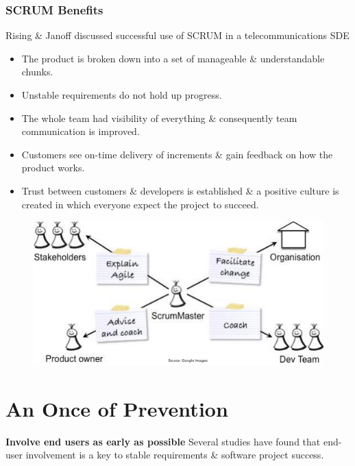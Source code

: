 \documentclass{report}
\begin{document}
\subsection{SCRUM Benefits}
\begin{multicols}{2}
\noindent Rising \& Janoff discussed successful use of SCRUM in a telecommunications SDE
\begin{itemize}
  \item The product is broken down into a set of manageable \& understandable chunks.
  \item Unstable requirements do not hold up progress.
  \item The whole team had visibility of everything \& consequently team communication is improved.
  \item Customers see on-time delivery of increments \& gain feedback on how the product works.
  \item Trust between customers \& developers is established \& a positive culture is created in which everyone expect the project to succeed.
\end{itemize}
\vfill\columnbreak
\begin{figure}[H]
\centering
\includegraphics[scale=.4,trim=1cm 1cm 1cm 1cm]{assets/CEN4010_Scrum_Cycle.jpg}
\end{figure}
\end{multicols}



\renewcommand\thechapter{A1}
\chapter{An Once of Prevention}
\noindent\textbf{Involve end users as early as possible}\newline
Several studies have found that end-user involvement is a key to stable requirements \& software project success.\newline
\end{document}
